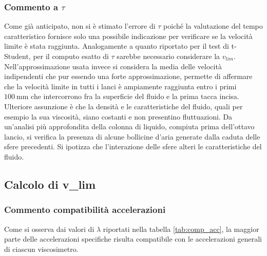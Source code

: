 \documentclass[a4paper,11pt,oneside]{article}
\begin{document}
\subsubsection*{Commento a $\tau$}
Come già anticipato, non si è stimato l'errore di $\tau$ poiché la valutazione del tempo caratteristico fornisce solo una possibile indicazione per verificare se la velocità limite è stata raggiunta.
Analogamente a quanto riportato per il test di t-Student, per il computo esatto di $\tau$ sarebbe necessario considerare la $v_{lim}$. Nell'approssimazione usata invece si considera la media delle velocità indipendenti che pur essendo una forte approssimazione, permette di affermare che la velocità limite in tutti i lanci è ampiamente raggiunta entro i primi $\SI{100}{\milli\metre}$ che intercorrono fra la superficie del fluido e la prima tacca incisa.\newline
Ulteriore assunzione è che la densità e le caratteristiche del fluido, quali per esempio la sua viscosità, siano costanti e non presentino fluttuazioni.
Da un'analisi più approfondita della colonna di liquido, compiuta prima dell'ottavo lancio, si verifica la presenza di alcune bollicine d'aria generate dalla caduta delle sfere precedenti. Si ipotizza che l'interazione delle sfere alteri le caratteristiche del fluido. 







\subsection{Calcolo di v_{lim}}
\subsubsection*{Commento compatibilità accelerazioni}
Come si osserva dai valori di $\lambda$ riportati nella tabella \ref{tab:comp_acc}, la maggior parte delle accelerazioni specifiche risulta compatibile con le accelerazioni generali di ciascun viscosimetro. 






\end{document}
